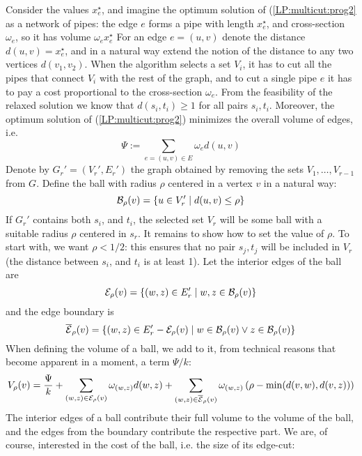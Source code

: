 \noindent
Consider the values  $x_e^\star$, and imagine the optimum solution of (\ref{LP:multicut:prog2} as a network of 
pipes: the edge $e$ forms a pipe with length  $x_e^\star$, and cross-section $\omega_e$, so it has volume
$\omega_ex_e^\star$ For an edge $e=(u,v)$ denote the distance $d(u,v)=x_e^\star$, and in a natural way extend the 
notion of the distance to any two vertices $d(v_1,v_2)$. When the algorithm selects a set $V_i$, it has to cut all
the pipes that connect $V_i$ with the rest of the graph, and to cut a single pipe $e$ it has to pay a cost proportional
to the cross-section $\omega_e$. From the feasibility of the relaxed solution we know that $d(s_i,t_i)\ge 1$ for
all pairs $s_i,t_i$. Moreover, the optimum solution of  (\ref{LP:multicut:prog2}) minimizes the overall volume of edges, i.e.
$$\Psi:=\sum_{e=(u,v)\in E}\omega_ed(u,v)$$
Denote  by $G_r'=(V_r',E_r')$ the graph obtained by removing the sets $V_1,\ldots,V_{r-1}$ from $G$.
Define the ball with radius $\rho$ centered in a vertex $v$ in a natural way:
$${\cal B}_\rho(v)=\{u\in V_r'\mid d(u,v)\le\rho\}$$
If $G_r'$ contains both $s_i$, and $t_i$, the selected set $V_r$ will be some ball with a suitable radius
$\rho$ centered in $s_r$. It remains to show how to set the value of $\rho$. To start with, we want 
$\rho<1/2$: this ensures that no pair $s_j,t_j$ will be included in $V_r$ (the distance between $s_i$, and $t_i$ 
is at least 1). Let the interior edges of the ball are
$${\cal E}_\rho(v)=\{(w,z)\in E_r'\mid w,z\in{\cal B}_\rho(v)\}$$
and the edge boundary is
$$\overline{\cal E}_\rho(v)=\{(w,z)\in E_r'-{\cal E}_\rho(v)\mid w\in{\cal B}_\rho(v)\vee z\in{\cal B}_\rho(v)\}$$
When defining the volume of a ball, we add to it, from technical reasons that become apparent in a moment, 
a term  $\Psi/k$:
$$V_\rho(v)=\frac{\Psi}{k}+\sum_{(w,z)\in{\cal E}_\rho(v)}\omega_{(w,z)}d(w,z)+
\sum_{(w,z)\in\overline{\cal E}_\rho(v)}\omega_{(w,z)}\left(\rho-\min(d(v,w),d(v,z))\right)$$
The interior edges of a ball contribute their full volume to the volume of the ball, and the edges from the
boundary contribute the respective part. We are, of course, interested in the cost of the ball, i.e. the size
of its edge-cut:

